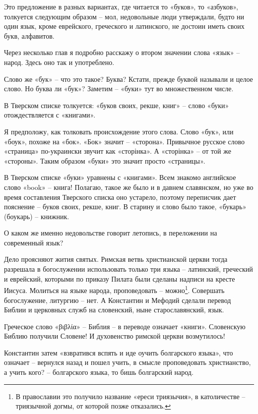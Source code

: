 Это предложение в разных вариантах, где читается то «буков», то «азбуков», толкуется следующим образом – мол, недовольные люди утверждали, будто ни один язык, кроме еврейского, греческого и латинского, не достоин иметь своих букв, алфавитов.

Через несколько глав я подробно расскажу о втором значении слова «язык» – народ. Здесь оно так и употреблено.

Слово же «бук» – что это такое? Буква? Кстати, прежде буквой называли и целое слово. Но буква ли «бук»? Заметим – «буки» тут во множественном числе.

В Тверском списке толкуется: «буков своих, рекше, книг» – слово «буки» отождествляется с «книгами».

Я предположу, как толковать происхождение этого слова. Слово «бук», или «боук», похоже на «бок». «Бок» значит – «сторона». Привычное русское слово «страница» по-украински звучит как «сторінка». А «сторінка» – от той же «стороны». Таким образом «буки» это значит просто «страницы».

В Тверском списке «буки» уравнены с «книгами». Всем знакомо английское слово «book» – книга! Полагаю, такое же было и в давнем славянском, но уже во время составления Тверского списка оно устарело, поэтому переписчик дает пояснение – буков своих, рекше, книг. В старину и слово было такое, «букарь» (боукарь) – книжник.

О каком же именно недовольстве говорит летопись, в переложении на современный язык?

Дело проясняют жития святых. Римская ветвь христианской церкви тогда разрешала в богослужении использовать только три языка – латинский, греческий и еврейский, которыми по приказу Пилата были сделаны надписи на кресте Иисуса. Молиться на языке народа, проповедовать – можно\footnote{В православии это получило название «ереси триязычия», в католичестве – триязычной догмы, от которой позже отказались.}. Совершать богослужение, литургию – нет. А Константин и Мефодий сделали перевод Библии и церковных служб на словенский, ныне старославянский, язык.

Греческое слово «βιβλία» – Библия – в переводе означает «книги». Словенскую Библию получили Словене! И духовенство римской церкви возмутилось!
 
Константин затем «взвратився вспять и иде оучить болгарского языка», что означает  – вернулся назад и пошел учить, в смысле проповедовать христианство, а учить кого? – болгарского языка, то бишь болгарский народ.

